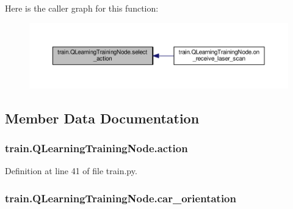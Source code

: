 Here is the caller graph for this function\+:
\nopagebreak
\begin{figure}[H]
\begin{center}
\leavevmode
\includegraphics[width=350pt]{classtrain_1_1_q_learning_training_node_ac03f4ced7d65ef3c2cf36978796fcfda_icgraph}
\end{center}
\end{figure}




\subsection{Member Data Documentation}
\subsubsection[{\texorpdfstring{action}{action}}]{\setlength{\rightskip}{0pt plus 5cm}train.\+Q\+Learning\+Training\+Node.\+action}\hypertarget{classtrain_1_1_q_learning_training_node_ad42c35a16230d89d787b5a3a74808edf}{}\label{classtrain_1_1_q_learning_training_node_ad42c35a16230d89d787b5a3a74808edf}


Definition at line 41 of file train.\+py.

\subsubsection[{\texorpdfstring{car\+\_\+orientation}{car_orientation}}]{\setlength{\rightskip}{0pt plus 5cm}train.\+Q\+Learning\+Training\+Node.\+car\+\_\+orientation}\hypertarget{classtrain_1_1_q_learning_training_node_a016d2adc85428e64903703974f8cd79c}{}\label{classtrain_1_1_q_learning_training_node_a016d2adc85428e64903703974f8cd79c}


